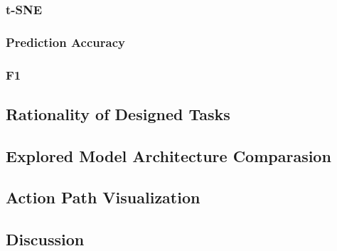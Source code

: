 \subsubsection{t-SNE}

\subsubsection{Prediction Accuracy}

\subsubsection{F1}


\subsection{Rationality of Designed Tasks}


\subsection{Explored Model Architecture Comparasion}

\subsection{Action Path Visualization}


\subsection{Discussion}



\cleardoublepage
